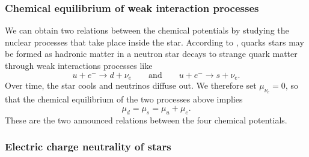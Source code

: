 \subsubsection{Chemical equilibrium of weak interaction processes}

We can obtain two relations between the chemical potentials by studying the nuclear processes that take place inside the star.
According to \cite{ref:quark_star_processes}, quarks stars may be formed as hadronic matter in a neutron star decays to strange quark matter through weak interactions processes like
\begin{equation}
	u + e^- \rightarrow d + \nu_e
	\qquad \text{and} \qquad
	u + e^- \rightarrow s + \nu_e .
\end{equation}
Over time, the star cools and neutrinos diffuse out. \cite[section 5.3]{ref:glendenning}
We therefore set $\mu_{\nu_e}=0$, so that the chemical equilibrium of the two processes above implies
\begin{equation}
	\mu_d = \mu_s = \mu_u + \mu_e .
\label{eq:lsm:chemical_equilibrium}
\end{equation}
These are the two announced relations between the four chemical potentials.

\subsubsection{Electric charge neutrality of stars}

